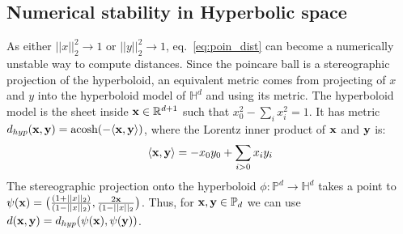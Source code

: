 \documentclass[11pt]{article}
\begin{document}
\subsection{Numerical stability in Hyperbolic space}
As either $||x||_{2}^{2}\to 1$ or $||y||_{2}^{2} \to 1$, eq.~\ref{eq:poin_dist} can become a numerically unstable way to compute distances.
Since the poincare ball is a stereographic projection of the hyperboloid, an equivalent metric comes from projecting of $x$ and $y$ into the hyperboloid model of $\mathbb{H}^{d}$ and using its metric.
The hyperboloid model is the sheet inside $\bold{x}\in\mathbb{R}^{d+1}$ such that $x_{0}^{2} - \sum_{i} x_{i}^{2} = 1$.
It has metric $d_{hyp}(\bold{x}, \bold{y}) = \text{acosh}(-\langle \bold{x}, \bold{y} \rangle)$, where the Lorentz inner product of $\bold{x}$ and $\bold{y}$ is:
\begin{equation*}
	\langle \bold{x}, \bold{y} \rangle = -x_{0}y_{0} + \sum_{i>0} x_{i}y_{i}
\end{equation*}
The stereographic projection onto the hyperboloid $\phi:\mathbb{P}^{d} \to \mathbb{H}^{d}$ takes a point to $\psi(\bold{x}) = \big(\frac{(1+||x||_{2})}{(1-||x||_{2})}, \frac{2 \bold{x}}{(1- ||x||_{2}}\big)$.
Thus, for $\bold{x}, \bold{y} \in \mathbb{P}_{d}$ we can use $d(\bold{x}, \bold{y}) = d_{hyp}(\psi(\bold{x}), \psi(\bold{y}))$.

\end{document}
